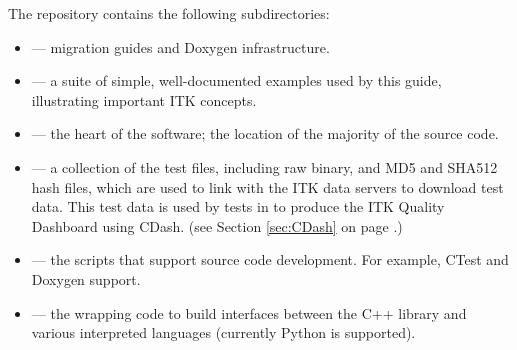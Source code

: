The  repository contains the following subdirectories:
\begin{itemize}
        \item {} --- migration guides and Doxygen infrastructure.
        \item {} --- a suite of simple, well-documented
        examples used by this guide, illustrating important
        ITK concepts.
        \item {} --- the heart of the software; the location
        of the majority of the source code.
        \item {} --- a collection of the test files, including
        raw binary, and MD5 and SHA512 hash files, which are used to link
        with the ITK data servers to download test data. This test data is
        used by tests in  to produce the ITK Quality
        Dashboard using CDash.
        (see Section \ref{sec:CDash} on page \pageref{sec:CDash}.)
        \item {} --- the scripts that support source code
        development. For example, CTest and Doxygen support.
        \item {} --- the wrapping code to build interfaces
        between the C++ library and various interpreted languages (currently
        Python is supported).
\end{itemize}

